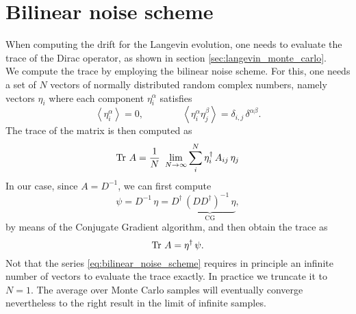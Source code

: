 \section*{Bilinear noise scheme}
When computing the drift for the Langevin evolution, one needs to evaluate the trace of the Dirac operator, as shown in section \ref{sec:langevin_monte_carlo}. \\
We compute the trace by employing the bilinear noise scheme. For this, one needs a set of $N$ vectors of normally distributed random complex numbers, namely vectors $\eta_i$ where each component $\eta_i^\alpha$ satisfies
\begin{equation*}
    \left\langle \eta_i^{\alpha} \right\rangle = 0, \qquad\qquad \left\langle \eta_i^{\alpha}\eta_j^{\beta} \right\rangle = \delta_{i,j} \, \delta^{\alpha \beta}.
\end{equation*}
The trace of the matrix is then computed as 
\begin{equation}
    \operatorname{\text{Tr} \,} {A} = \frac{1}{N} \ \lim_{N \to \infty} \sum_i^N \eta_i^{\dagger} \, A_{ij} \, \eta_j
    \label{eq:bilinear_noise_scheme}
\end{equation}
In our case, since $A = D^{-1}$, we can first compute
\begin{equation*}
    \psi = D^{-1} \, \eta = D^\dagger \, \underbrace{(D D^\dagger)^{-1} \, \eta}_{\text{CG}},
\end{equation*}
by means of the Conjugate Gradient algorithm, and then obtain the trace as 
\begin{equation*}
    \operatorname{\text{Tr} \,} {A} = \eta^{\dagger} \, \psi.
\end{equation*}
Not that the series \eqref{eq:bilinear_noise_scheme} requires in principle an infinite number of vectors to evaluate the trace exactly. In practice we truncate it to $N=1$. The average over Monte Carlo samples will eventually converge nevertheless to the right result in the limit of infinite samples. \\~\\
